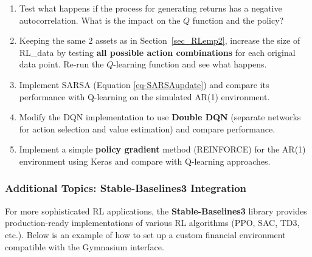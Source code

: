 \begin{enumerate}
\item Test what happens if the process for generating returns has a negative autocorrelation. What is the impact on the $Q$ function and the policy?
\item Keeping the same 2 assets as in Section~\ref{sec_RLemp2}, increase the size of RL\_data by testing \textbf{all possible action combinations} for each original data point. Re-run the $Q$-learning function and see what happens.
\item Implement SARSA (Equation \ref{eq-SARSAupdate}) and compare its performance with Q-learning on the simulated AR(1) environment.
\item Modify the DQN implementation to use \textbf{Double DQN} (separate networks for action selection and value estimation) and compare performance.
\item Implement a simple \textbf{policy gradient} method (REINFORCE) for the AR(1) environment using Keras and compare with Q-learning approaches.
\end{enumerate}

\subsubsection{Additional Topics: Stable-Baselines3 Integration}

For more sophisticated RL applications, the \textbf{Stable-Baselines3} library provides production-ready implementations of various RL algorithms (PPO, SAC, TD3, etc.). Below is an example of how to set up a custom financial environment compatible with the Gymnasium interface.

